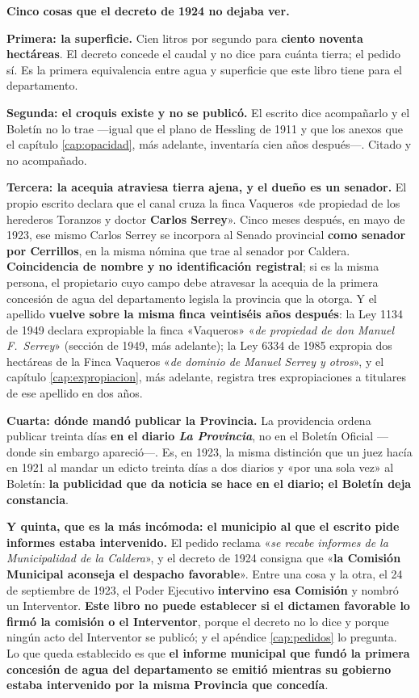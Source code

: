 \begin{cautela}
\textbf{Cinco cosas que el decreto de 1924 no dejaba ver.}

\textbf{Primera: la superficie.} Cien litros por segundo para \textbf{ciento noventa hectáreas}.
El decreto concede el caudal y no dice para cuánta tierra; el pedido sí. Es la primera
equivalencia entre agua y superficie que este libro tiene para el departamento.

\textbf{Segunda: el croquis existe y no se publicó.} El escrito dice acompañarlo y el Boletín
no lo trae ---igual que el plano de Hessling de 1911 y que los anexos que el capítulo
\ref{cap:opacidad}, más adelante, inventaría cien años después---. Citado y no acompañado.

\textbf{Tercera: la acequia atraviesa tierra ajena, y el dueño es un senador.} El propio escrito
declara que el canal cruza la finca Vaqueros «de propiedad de los herederos Toranzos y doctor
\textbf{Carlos Serrey}». Cinco meses después, en mayo de 1923, ese mismo
Carlos Serrey se incorpora al Senado provincial \textbf{como senador por Cerrillos}, en la misma
nómina que trae al senador por Caldera. \textbf{Coincidencia de nombre y no identificación
registral}; si es la misma persona, el propietario cuyo campo debe atravesar la acequia de la
primera concesión de agua del departamento legisla la provincia que la otorga. Y el apellido
\textbf{vuelve sobre la misma finca veintiséis años después}: la Ley 1134 de 1949 declara expropiable la finca
«Vaqueros» «\textit{de propiedad de don Manuel F.\ Serrey}» (sección de 1949, más adelante); la Ley 6334 de 1985
expropia dos hectáreas de la Finca Vaqueros «\textit{de dominio de Manuel Serrey y otros}», y el capítulo
\ref{cap:expropiacion}, más adelante, registra tres expropiaciones a titulares de ese apellido en dos años.

\textbf{Cuarta: dónde mandó publicar la Provincia.} La providencia ordena publicar treinta días
\textbf{en el diario \textit{La Provincia}}, no en el Boletín Oficial ---donde sin embargo
apareció---. Es, en 1923, la misma distinción que un juez hacía en 1921 al mandar un edicto
treinta días a dos diarios y «por una sola vez» al Boletín: \textbf{la publicidad que da noticia
se hace en el diario; el Boletín deja constancia}.

\textbf{Y quinta, que es la más incómoda: el municipio al que el escrito pide informes estaba
intervenido.} El pedido reclama «\textit{se recabe informes de la Municipalidad de la Caldera}»,
y el decreto de 1924 consigna que «\textbf{la Comisión Municipal aconseja el despacho
favorable}». Entre una cosa y la otra, el 24 de septiembre de 1923, el Poder Ejecutivo
\textbf{intervino esa Comisión} y nombró un Interventor. \textbf{Este libro no puede establecer
si el dictamen favorable lo firmó la comisión o el Interventor}, porque el decreto no lo dice y
porque ningún acto del Interventor se publicó; y el apéndice \ref{cap:pedidos} lo pregunta. Lo
que queda establecido es que \textbf{el informe municipal que fundó la primera concesión de agua
del departamento se emitió mientras su gobierno estaba intervenido por la misma Provincia que
concedía}.


\end{cautela}
